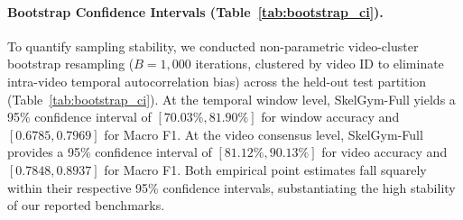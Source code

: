\documentclass[runningheads]{llncs}
\begin{document}
\begin{table}[!t]
\centering
\caption{Statistical hypothesis testing evaluating pairwise performance differences across held-out test windows ($N=2,743$, McNemar's test) and test video consensus confidence ($N=233$, Wilcoxon signed-rank and paired $t$-test).}
\label{tab:statistical_tests}
\end{table}

\paragraph{Bootstrap Confidence Intervals (Table~\ref{tab:bootstrap_ci}).}
To quantify sampling stability, we conducted non-parametric video-cluster bootstrap resampling ($B=1,000$ iterations, clustered by video ID to eliminate intra-video temporal autocorrelation bias) across the held-out test partition (Table~\ref{tab:bootstrap_ci}). At the temporal window level, SkelGym-Full yields a 95\% confidence interval of $[70.03\%, 81.90\%]$ for window accuracy and $[0.6785, 0.7969]$ for Macro F1. At the video consensus level, SkelGym-Full provides a 95\% confidence interval of $[81.12\%, 90.13\%]$ for video accuracy and $[0.7848, 0.8937]$ for Macro F1. Both empirical point estimates fall squarely within their respective 95\% confidence intervals, substantiating the high stability of our reported benchmarks.
\end{document}
